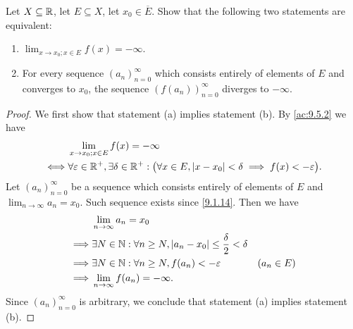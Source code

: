 \begin{ac}\label{ac:9.5.4}
  Let \(X \subseteq \mathbb{R}\), let \(E \subseteq X\), let \(x_0 \in \overline{E}\).
  Show that the following two statements are equivalent:
  \begin{enumerate}
    \item \(\lim_{x \to x_0 ; x \in E} f(x) = -\infty\).
    \item For every sequence \((a_n)_{n = 0}^\infty\) which consists entirely of elements of \(E\) and converges to \(x_0\), the sequence \((f(a_n))_{n = 0}^\infty\) diverges to \(-\infty\).
  \end{enumerate}
\end{ac}

\begin{proof}
  We first show that statement (a) implies statement (b).
  By \cref{ac:9.5.2} we have
  \begin{align*}
         & \lim_{x \to x_0 ; x \in E} f(x) = -\infty                                                                                               \\
    \iff & \forall \varepsilon \in \mathbb{R}^+, \exists \delta \in \mathbb{R}^+ : \big(\forall x \in E, \left\lvert x - x_0\right\rvert < \delta \implies f(x) < -\varepsilon\big).
  \end{align*}
  Let \((a_n)_{n = 0}^\infty\) be a sequence which consists entirely of elements of \(E\) and \(\lim_{n \to \infty} a_n = x_0\).
  Such sequence exists since \cref{9.1.14}.
  Then we have
  \begin{align*}
             & \lim_{n \to \infty} a_n = x_0                                                                      \\
    \implies & \exists N \in \mathbb{N} : \forall n \geq N, \left\lvert a_n - x_0\right\rvert \leq \dfrac{\delta}{2} < \delta               \\
    \implies & \exists N \in \mathbb{N} : \forall n \geq N, f(a_n) < -\varepsilon                           & (a_n \in E) \\
    \implies & \lim_{n \to \infty} f(a_n) = -\infty.
  \end{align*}
  Since \((a_n)_{n = 0}^\infty\) is arbitrary, we conclude that statement (a) implies statement (b).


\end{proof}
